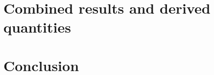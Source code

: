 
\section{Combined results and derived quantities}
\label{sec:combination}



\section{Conclusion}
\label{sec:conclusion}
